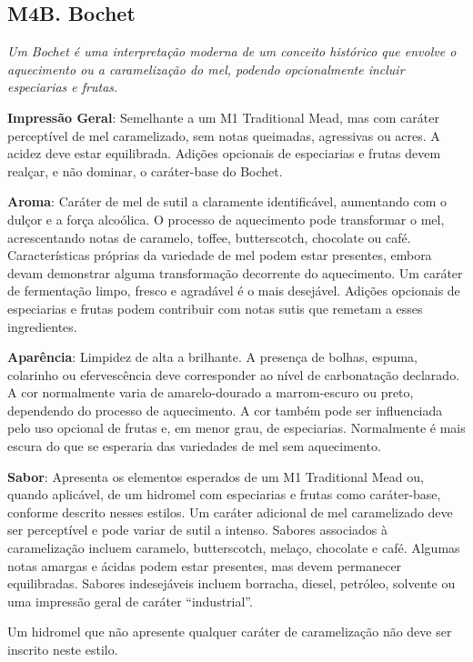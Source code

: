 \subsection*{M4B. Bochet}

\textit{Um Bochet é uma interpretação moderna de um conceito histórico que envolve o aquecimento ou a caramelização do mel, podendo opcionalmente incluir especiarias e frutas.}

\textbf{Impressão Geral}: Semelhante a um M1 Traditional Mead, mas com caráter perceptível de mel caramelizado, sem notas queimadas, agressivas ou acres. A acidez deve estar equilibrada. Adições opcionais de especiarias e frutas devem realçar, e não dominar, o caráter-base do Bochet.

\textbf{Aroma}: Caráter de mel de sutil a claramente identificável, aumentando com o dulçor e a força alcoólica. O processo de aquecimento pode transformar o mel, acrescentando notas de caramelo, toffee, butterscotch, chocolate ou café. Características próprias da variedade de mel podem estar presentes, embora devam demonstrar alguma transformação decorrente do aquecimento. Um caráter de fermentação limpo, fresco e agradável é o mais desejável. Adições opcionais de especiarias e frutas podem contribuir com notas sutis que remetam a esses ingredientes.

\textbf{Aparência}: Limpidez de alta a brilhante. A presença de bolhas, espuma, colarinho ou efervescência deve corresponder ao nível de carbonatação declarado. A cor normalmente varia de amarelo-dourado a marrom-escuro ou preto, dependendo do processo de aquecimento. A cor também pode ser influenciada pelo uso opcional de frutas e, em menor grau, de especiarias. Normalmente é mais escura do que se esperaria das variedades de mel sem aquecimento.

\textbf{Sabor}: Apresenta os elementos esperados de um M1 Traditional Mead ou, quando aplicável, de um hidromel com especiarias e frutas como caráter-base, conforme descrito nesses estilos. Um caráter adicional de mel caramelizado deve ser perceptível e pode variar de sutil a intenso. Sabores associados à caramelização incluem caramelo, butterscotch, melaço, chocolate e café. Algumas notas amargas e ácidas podem estar presentes, mas devem permanecer equilibradas. Sabores indesejáveis incluem borracha, diesel, petróleo, solvente ou uma impressão geral de caráter ``industrial''.

Um hidromel que não apresente qualquer caráter de caramelização não deve ser inscrito neste estilo.

